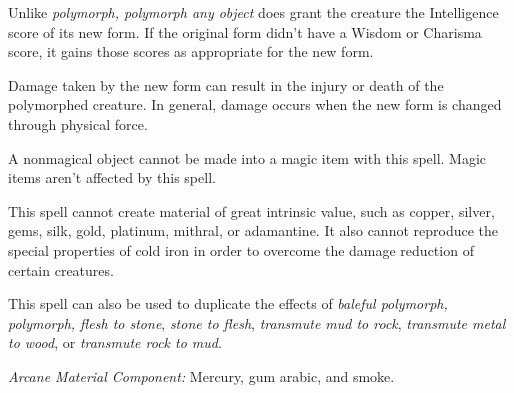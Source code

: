 Unlike \textit{polymorph, polymorph any object} does grant the creature the Intelligence 
score of its new form. If the original form didn't have a Wisdom or Charisma score, 
it gains those scores as appropriate for the new form.

Damage taken by the new form can result in the injury or death of the polymorphed 
creature. In general, damage occurs when the new form is changed through physical 
force.

A nonmagical object cannot be made into a magic item with this spell. Magic items 
aren't affected by this spell.

This spell cannot create material of great intrinsic value, such as copper, silver, 
gems, silk, gold, platinum, mithral, or adamantine. It also cannot reproduce the 
special properties of cold iron in order to overcome the damage reduction of certain 
creatures.

This spell can also be used to duplicate the effects of \textit{baleful polymorph, 
polymorph, flesh to stone}, \textit{stone to flesh}, \textit{transmute mud to rock}, 
\textit{transmute metal to wood}, or \textit{transmute rock to mud}.

\textit{Arcane Material Component:} Mercury, gum arabic, and smoke.

